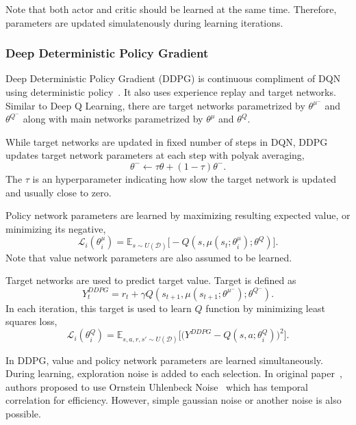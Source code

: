 Note that both actor and critic should be learned at the same time. Therefore, parameters are updated simulatenously during learning iterations. 

\subsubsection{Deep Deterministic Policy Gradient}
Deep Deterministic Policy Gradient (DDPG) is continuous compliment of DQN using deterministic policy~\cite{lillicrap_continuous_2019}. 
It also uses experience replay and target networks. 
Similar to Deep Q Learning, there are target networks parametrized by $\theta^{\mu^-}$ and $\theta^{Q^-}$ 
along with main networks parametrized by $\theta^{\mu}$ and $\theta^{Q}$. 

While target networks are updated in fixed number of steps in DQN, 
DDPG updates target network parameters at each step with polyak averaging, 
\begin{equation}
\label{eqn:target_update}
\theta^- \leftarrow \tau \theta + (1-\tau) \theta^- .
\end{equation}
The $\tau$ is an hyperparameter indicating how slow the target network is updated and usually close to zero. 

Policy network parameters are learned by maximizing resulting expected value, or minimizing its negative,
\begin{equation}
\label{eqn:ddpg_policy_loss}
\mathcal{L}_i(\theta^\mu_i) = \mathbb{E}_{s \sim U(\mathcal{D})} \Big[ -Q(s, \mu(s_t;\theta^\mu_i);\theta^Q) \Big].
\end{equation} 
Note that value network parameters are also assumed to be learned. 

Target networks are used to predict target value. Target is defined as 
\begin{equation}
\label{eqn:ddpg_target}
Y_t^{DDPG} = r_t + \gamma Q(s_{t+1}, \mu(s_{t+1};\theta^{\mu^-});\theta^{Q^-}).
\end{equation}
In each iteration, this target is used to learn $Q$ function by minimizing least squares loss, 
\begin{equation}
\label{eqn:ddpg_loss}
\mathcal{L}_i(\theta^Q_i) = \mathbb{E}_{s,a,r,s'\sim U(\mathcal{D})}\Big[\big( Y^{DDPG} - Q(s,a;\theta^Q_i) \big) ^ 2 \Big].
\end{equation}

In DDPG, value and policy network parameters are learned simultaneously. 
During learning, exploration noise is added to each selection. 
In original paper~\cite{lillicrap_continuous_2019}, authors proposed to use Ornstein Uhlenbeck Noise~\cite{uhlenbeck_theory_1930} which has temporal correlation for efficiency. 
However, simple gaussian noise or another noise is also possible. 

